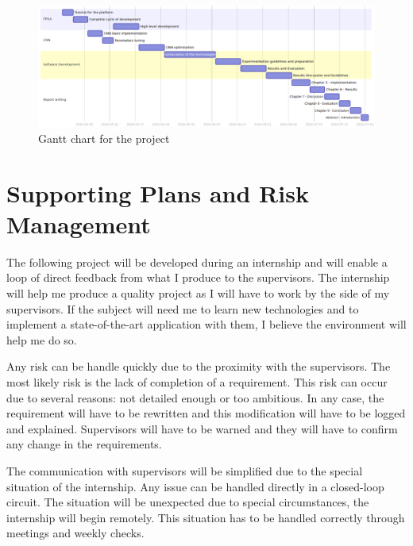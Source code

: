 \begin{figure}[htbp]
	\centering
		\includegraphics[width=\textwidth]{Figures/gantt.png}
	\caption[Gantt Chart]{Gantt chart for the project}
	\label{fig:gantt}
\end{figure}


\section{Supporting Plans and Risk Management}


The following project will be developed during an internship and will enable a loop of direct feedback from what I produce to the supervisors. The internship will help me produce a quality project as I will have to work by the side of my supervisors. If the subject will need me to learn new technologies and to implement a state-of-the-art application with them, I believe the environment will help me do so.

Any risk can be handle quickly due to the proximity with the supervisors. The most likely risk is the lack of completion of a requirement. This risk can occur due to several reasons: not detailed enough or too ambitious. In any case, the requirement will have to be rewritten and this modification will have to be logged and explained. Supervisors will have to be warned and they will have to confirm any change in the requirements.

The communication with supervisors will be simplified due to the special situation of the internship. Any issue can be handled directly in a closed-loop circuit. The situation will be unexpected due to special circumstances, the internship will begin remotely. This situation has to be handled correctly through meetings and weekly checks.
